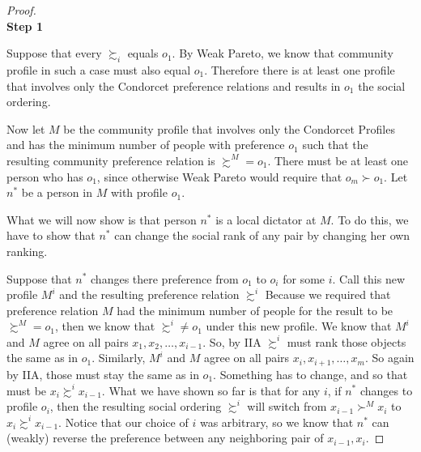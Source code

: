 
%





\begin{proof}
~\\
\noindent \textbf{Step 1}

Suppose that every $\succsim_i$ equals $o_1$. By Weak Pareto, we know that community profile in such a case must also equal $o_1$. Therefore there is at least one profile that involves only the Condorcet preference relations and results in $o_1$ the social ordering.  

Now let $M$ be the community profile that involves only the Condorcet Profiles and has the minimum number of people with preference $o_1$ such that the resulting community preference relation is $\succsim^M = o_1$. There must be at least one person who has $o_1$, since otherwise Weak Pareto would require that $o_m \succ o_1$.  Let $n^*$ be a person in $M$ with profile $o_1$.

What we will now show is that person $n^*$ is a local dictator at $M$.  To do this, we have to show that $n^*$ can change the social rank of any pair by changing her own ranking. 

Suppose that $n^*$ changes there preference from $o_1$ to $o_i$ for some $i$. Call this new profile $M^i$ and the resulting preference relation $\succsim^i$ Because we required that preference relation $M$ had the minimum number of people for the result to be $\succsim^M = o_1$, then we know that $\succsim^i \ne o_1$ under this new profile.  We know that $M^i$ and $M$ agree on all pairs $x_1, x_2, \dots, x_{i-1}$. So, by IIA $\succsim^i$ must rank those objects the same as in $o_1$.  Similarly, $M^i$ and $M$ agree on all pairs $x_i, x_{i+1}, \dots, x_m$.  So again by IIA, those must stay the same as in $o_1$.  Something has to change, and so that must be $x_i \succsim^i x_{i-1}$.  
What we have shown so far is that for any $i$, if $n^*$ changes to profile $o_i$, then the resulting social ordering $\succsim^i$ will switch from $x_{i-1} \succ^M x_{i}$ to $x_{i} \succsim^i x_{i-1}$. Notice that our choice of $i$ was arbitrary, so we know that $n^*$ can (weakly) reverse the preference between any neighboring pair of $x_{i-1}, x_i$.


\end{proof}
